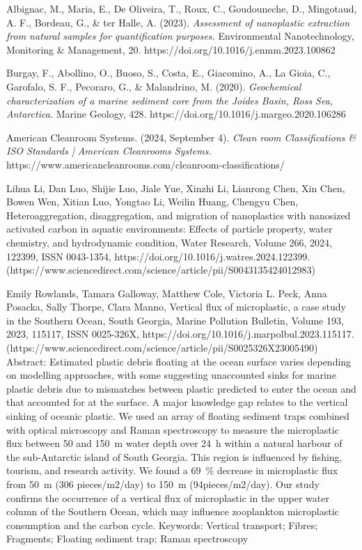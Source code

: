 \documentclass[twocolumn,a4paper,aps,amsmath,amssymb,floatfix,superscriptaddress]{revtex4-2}
\begin{document}
	\begin{thebibliography}{10}
		
		Albignac, M., Maria, E., De Oliveira, T., Roux, C., Goudouneche, D., Mingotaud, A. F., Bordeau, G., \& ter Halle, A. (2023). \textit{Assessment of nanoplastic extraction from natural samples for quantification purposes.} Environmental Nanotechnology, Monitoring \& Management, 20. https://doi.org/10.1016/j.enmm.2023.100862
		
		Burgay, F., Abollino, O., Buoso, S., Costa, E., Giacomino, A., La Gioia, C., Garofalo, S. F., Pecoraro, G., \& Malandrino, M. (2020). \textit{Geochemical characterization of a marine sediment core from the Joides Basin, Ross Sea, Antarctica.} Marine Geology, 428. https://doi.org/10.1016/j.margeo.2020.106286 
				
		American Cleanroom Systems. (2024, September 4). \textit{Clean room Classifications \& ISO Standards | American Cleanrooms Systems.} https://www.americancleanrooms.com/cleanroom-classifications/
		
		Lihua Li, Dan Luo, Shijie Luo, Jiale Yue, Xinzhi Li, Lianrong Chen, Xin Chen, Bowen Wen, Xitian Luo, Yongtao Li, Weilin Huang, Chengyu Chen,
		Heteroaggregation, disaggregation, and migration of nanoplastics with nanosized activated carbon in aquatic environments: Effects of particle property, water chemistry, and hydrodynamic condition,
		Water Research,
		Volume 266,
		2024,
		122399,
		ISSN 0043-1354,
		https://doi.org/10.1016/j.watres.2024.122399.
		(https://www.sciencedirect.com/science/article/pii/S0043135424012983)
		
		Emily Rowlands, Tamara Galloway, Matthew Cole, Victoria L. Peck, Anna Posacka, Sally Thorpe, Clara Manno,
		Vertical flux of microplastic, a case study in the Southern Ocean, South Georgia,
		Marine Pollution Bulletin,
		Volume 193,
		2023,
		115117,
		ISSN 0025-326X,
		https://doi.org/10.1016/j.marpolbul.2023.115117.
		(https://www.sciencedirect.com/science/article/pii/S0025326X23005490)
		Abstract: Estimated plastic debris floating at the ocean surface varies depending on modelling approaches, with some suggesting unaccounted sinks for marine plastic debris due to mismatches between plastic predicted to enter the ocean and that accounted for at the surface. A major knowledge gap relates to the vertical sinking of oceanic plastic. We used an array of floating sediment traps combined with optical microscopy and Raman spectroscopy to measure the microplastic flux between 50 and 150 m water depth over 24 h within a natural harbour of the sub-Antarctic island of South Georgia. This region is influenced by fishing, tourism, and research activity. We found a 69 \% decrease in microplastic flux from 50 m (306 pieces/m2/day) to 150 m (94pieces/m2/day). Our study confirms the occurrence of a vertical flux of microplastic in the upper water column of the Southern Ocean, which may influence zooplankton microplastic consumption and the carbon cycle.
		Keywords: Vertical transport; Fibres; Fragments; Floating sediment trap; Raman spectroscopy
		

\end{thebibliography}
\end{document}
